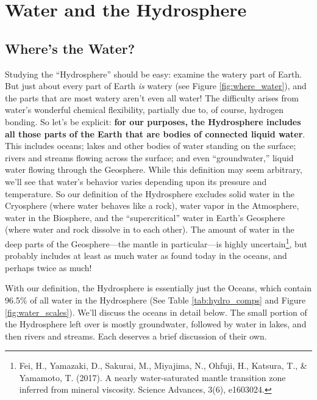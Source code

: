 \documentclass[amstex,12pt]{book}
\begin{document}
\section{Water and the Hydrosphere}
\subsection{Where's the Water?}
 Studying the ``Hydrosphere'' should be easy: examine the watery part of Earth. But just about every part of Earth \emph{is} watery (see Figure \ref{fig:where_water}), and the parts that are most watery aren't even all water! The difficulty arises from water's wonderful chemical flexibility, partially due to, of course, hydrogen bonding. So let's be explicit: \textbf{for our purposes, the Hydrosphere includes all those parts of the Earth that are bodies of connected liquid water}. This includes oceans; lakes and other bodies of water standing on the surface; rivers and streams flowing across the surface; and even ``groundwater,'' liquid water flowing through the Geosphere. While this definition may seem arbitrary, we'll see that water's behavior varies depending upon its pressure and temperature. So our definition of the Hydrosphere excludes solid water in the Cryosphere (where water behaves like a rock), water vapor in the Atmosphere, water in the Biosphere, and the ``supercritical'' water in Earth's Geosphere (where water and rock dissolve in to each other). The amount of water in the deep parts of the Geosphere---the mantle in particular---is highly uncertain\footnote{Fei, H., Yamazaki, D., Sakurai, M., Miyajima, N., Ohfuji, H., Katsura, T., \& Yamamoto, T. (2017). A nearly water-saturated mantle transition zone inferred from mineral viscosity. Science Advances, 3(6), e1603024.}, but probably includes at least as much water as found today in the oceans, and perhaps twice as much! 
    
With our definition, the Hydrosphere is essentially just the Oceans, which contain 96.5\% of all water in the Hydrosphere (See Table \ref{tab:hydro_comps} and Figure \ref{fig:water_scales}). We'll discuss the oceans in detail below. The small portion of the Hydrosphere left over is mostly groundwater, followed by water in lakes, and then rivers and streams. Each deserves a brief discussion of their own.
\end{document}
